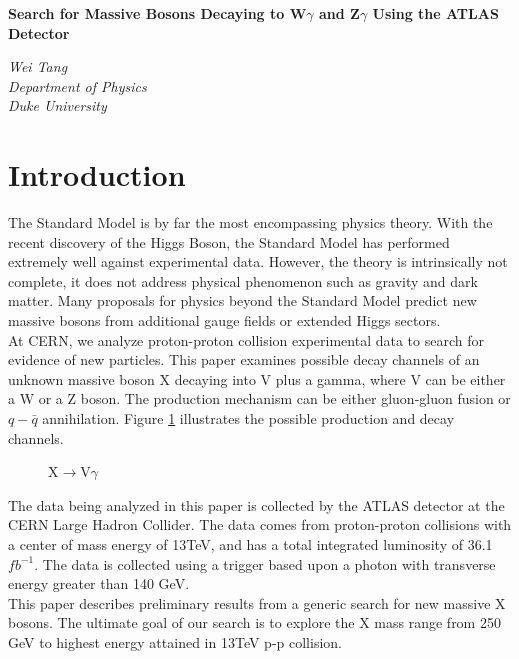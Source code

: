 \documentclass[12pt]{article}
\def\Title#1{\begin{center} {\Large {\bf #1} } \end{center}}
\begin{document}
\Title{Search for Massive Bosons Decaying to W$\gamma$ and Z$\gamma$ Using the ATLAS Detector}

\bigskip\bigskip


\begin{raggedright}  

{\it Wei Tang\\
Department of Physics\\
Duke University}
\bigskip\bigskip
\end{raggedright}

\tableofcontents
\clearpage

\section{Introduction}
The Standard Model is by far the most encompassing physics theory. With the recent discovery of the Higgs Boson, the Standard Model has performed extremely well against experimental data. However, the theory is intrinsically not complete, it does not address physical phenomenon such as gravity and dark matter. Many proposals for physics beyond the Standard Model predict new massive bosons from additional gauge fields or extended Higgs sectors.\\
At CERN, we analyze proton-proton collision experimental data to search for evidence of new particles. This paper examines possible decay channels of an unknown massive boson X decaying into V plus a gamma, where V can be either a W or a Z boson. The production mechanism can be either gluon-gluon fusion or $q-\bar{q}$ annihilation. Figure \ref{decay-channels} illustrates the possible production and decay channels.\\
\begin{figure}[H]
\begin{center}
\caption[Caption for LOF]{X$\rightarrow$V$\gamma$}
\label{decay-channels}
\end{center}
\end{figure}
The data being analyzed in this paper is collected by the ATLAS detector at the CERN Large Hadron Collider. The data comes from proton-proton collisions with a center of mass energy of 13TeV, and has a total integrated luminosity of 36.1 $fb^{-1}$. The data is collected using a trigger based upon a photon with transverse energy greater than 140 GeV.\\
This paper describes preliminary results from a generic search for new massive X bosons. The ultimate goal of our search is to explore the X mass range from 250 GeV to highest energy attained in 13TeV p-p collision.
\end{document}
